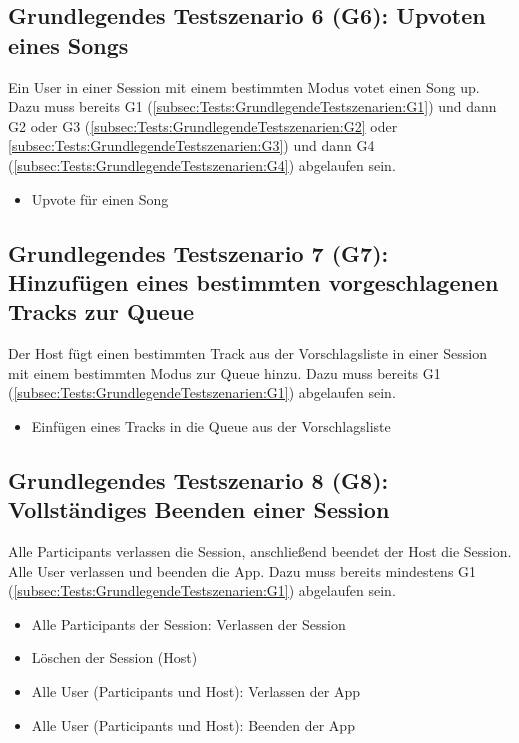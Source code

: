\documentclass[oneside, ngerman]{sdqtechreport}
\begin{document}
\subsection{Grundlegendes Testszenario 6 (G6): Upvoten eines Songs}
\label{subsec:Tests:GrundlegendeTestszenarien:G6}
Ein User in einer Session mit einem bestimmten Modus votet einen Song up. \\
Dazu muss bereits G1 (\ref{subsec:Tests:GrundlegendeTestszenarien:G1}) und dann G2 oder G3 (\ref{subsec:Tests:GrundlegendeTestszenarien:G2} oder \ref{subsec:Tests:GrundlegendeTestszenarien:G3}) und dann G4 (\ref{subsec:Tests:GrundlegendeTestszenarien:G4}) abgelaufen sein.
\begin{itemize}
    \item Upvote für einen Song
\end{itemize}

\subsection{Grundlegendes Testszenario 7 (G7): Hinzufügen eines bestimmten vorgeschlagenen Tracks zur Queue}
\label{subsec:Tests:GrundlegendeTestszenarien:G7}
Der Host fügt einen bestimmten Track aus der Vorschlagsliste in einer Session mit einem bestimmten Modus zur Queue hinzu.
Dazu muss bereits G1 (\ref{subsec:Tests:GrundlegendeTestszenarien:G1}) abgelaufen sein.
\begin{itemize}
    \item Einfügen eines Tracks in die Queue aus der Vorschlagsliste
\end{itemize}

\subsection{Grundlegendes Testszenario 8 (G8): Vollständiges Beenden einer Session}
\label{subsec:Tests:GrundlegendeTestszenarien:G8}
Alle Participants verlassen die Session, anschließend beendet der Host die Session. Alle User verlassen und beenden die App.
Dazu muss bereits mindestens G1 (\ref{subsec:Tests:GrundlegendeTestszenarien:G1}) abgelaufen sein.
\begin{itemize}
    \item Alle Participants der Session: Verlassen der Session
    \item Löschen der Session (Host)
    \item Alle User (Participants und Host): Verlassen der App
    \item Alle User (Participants und Host): Beenden der App
\end{itemize}
\end{document}

